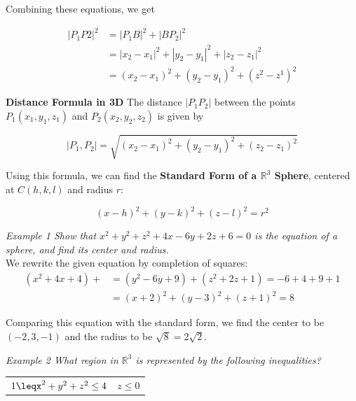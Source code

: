         \noindent Combining these equations, we get

        \begin{align*}
            |P_1P2|^2 &= |P_1B|^2+|BP_2|^2\\
            &= |x_2-x_1|^2+|y_2-y_1|^2+|z_2-z_1|^2\\
            &= (x_2-x_1)^2+(y_2-y_1)^2+(z^2-z^1)^2
        \end{align*}

        \noindent \color{purple} \textbf{Distance Formula in 3D} \color{black} The distance
        $|P_1P_2|$ between the points $P_1(x_1,y_1,z_1)$ and $P_2(x_2,y_2,z_2)$ is given by

        \begin{equation*}
            |P_1, P_2|=\sqrt{(x_2-x_1)^2+(y_2-y_1)^2+(z_2-z_1)^2}
        \end{equation*}

        \noindent Using this formula, we can find the \color{purple} \textbf{Standard Form of
        a $\mathbb{R}^3$ Sphere}\color{black}, centered at $C(h,k,l)$ and radius $r$:

        \begin{equation*}
            (x-h)^2+(y-k)^2+(z-l)^2=r^2
        \end{equation*}

        \noindent \color{blue} \textit{Example 1 Show that $x^2+y^2+z^2+4x-6y+2z+6=0$ is the
        equation of a sphere, and find its center and radius.}\color{black}\\

        \noindent We rewrite the given equation by completion of squares:
        \begin{align*}
            (x^2+4x+4)+ &= (y^2-6y+9)+(z^2+2z+1)=-6+4+9+1\\
            &= (x+2)^2+(y-3)^2+(z+1)^2=8
        \end{align*}

        \noindent Comparing this equation with the standard form, we find the center to be
        $(-2,3,-1)$ and the radius to be $\sqrt{8}=2\sqrt{2}.$

        \noindent \color{blue} \textit{Example 2 What region in $\mathbb{R}^3$ is represented
        by the following inequalities?}

        \begin{center}
            \begin{tabular}{cc}
                $1\leqx^2+y^2+z^2\leq4$
                & $z\leq0$
            \end{tabular}
        \end{center}
        \color{black}

